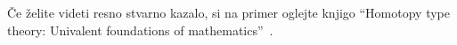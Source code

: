 \documentclass{article}
\begin{document}
Če želite videti resno stvarno kazalo, si na primer oglejte knjigo ``Homotopy type theory:
Univalent foundations of mathematics''~\cite{hottbook}.







\printindex
\end{document}
